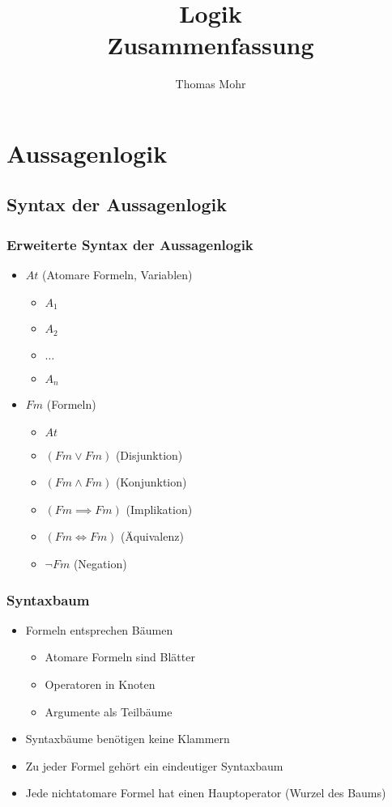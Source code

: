 \documentclass{scrartcl}
\title{Logik \\ Zusammenfassung}
\author{Thomas Mohr}
\date{}
\begin{document}
\maketitle
\pagebreak
\tableofcontents{}
\pagebreak

\section{Aussagenlogik}

\subsection{Syntax der Aussagenlogik}

\subsubsection{Erweiterte Syntax der Aussagenlogik}

\begin{itemize}
	\item $At$ (Atomare Formeln, Variablen)
	\begin{itemize}
		\item $A_1$
		\item $A_2$
		\item $\ldots$
		\item $A_n$
	\end{itemize}
	\item $Fm$ (Formeln)
	\begin{itemize}
		\item $At$
		\item $(Fm \vee Fm)$ (Disjunktion)
		\item $(Fm \wedge Fm)$ (Konjunktion)
		\item $(Fm \implies Fm)$ (Implikation)
		\item $(Fm \iff Fm)$ (Äquivalenz)
		\item $\neg Fm$ (Negation)
	\end{itemize}
\end{itemize}

\subsubsection{Syntaxbaum}

\begin{itemize}
	\item Formeln entsprechen Bäumen
	\begin{itemize}
		\item Atomare Formeln sind Blätter
		\item Operatoren in Knoten
		\item Argumente als Teilbäume
	\end{itemize}
	\item Syntaxbäume benötigen keine Klammern
	\item Zu jeder Formel gehört ein eindeutiger Syntaxbaum
	\item Jede nichtatomare Formel hat einen Hauptoperator (Wurzel des Baums)
\end{itemize}
\end{document}
